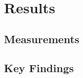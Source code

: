 \section{Results}
\label{sec:results}

\subsection{Measurements}
\label{subsec:measurements}


\subsection{Key Findings}
\label{subsec:findings}


